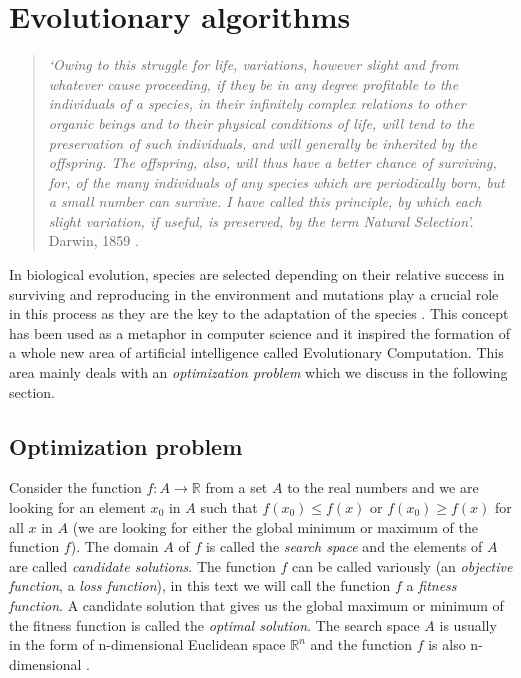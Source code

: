 \chapter{Evolutionary algorithms}
\begin{quotation}
\textit{‘Owing to this struggle for life, variations, however slight and from whatever cause proceeding, if they be in any degree profitable to the individuals of a species, in their infinitely complex relations to other organic beings and to their physical conditions of life, will tend to the preservation of such individuals, and will generally be inherited by the offspring. The offspring, also, will thus have a better chance of surviving, for, of the many individuals of any species which are periodically born, but a small number can survive. I have called this principle, by which each slight variation, if useful, is preserved, by the term Natural Selection’.} Darwin, 1859 \cite[p.40]{Darwin}.
\end{quotation}

In biological evolution, species are selected depending on their relative success in surviving and reproducing in the environment and mutations play a crucial role in this process as they are the key to the adaptation of the species \cite{natural-computing-algorithms}. This concept has been used as a metaphor in computer science and it inspired the formation of a whole new area of artificial intelligence called Evolutionary Computation. This area mainly deals with an \textit{optimization problem} which we discuss in the following section.

\section{Optimization problem}
Consider the function $f: A \to \mathbb{R}$ from a set $A$ to the real numbers and we are looking for an element $x_0$ in $A$ such that $f(x_0) \leq f(x)$ or $f(x_0) \geq f(x)$ for all $x$ in $A$ (we are looking for either the global minimum or maximum of the function $f$). The domain $A$ of $f$ is called the \textit{search space} and the elements of $A$ are called \textit{candidate solutions}. The function $f$ can be called variously (an \textit{objective function}, a \textit{loss function}), in this text we will call the function $f$ a \textit{fitness function}. A candidate solution that gives us the global maximum or minimum of the fitness function is called the \textit{optimal solution}. The search space $A$ is usually in the form of n-dimensional Euclidean space $\mathbb{R}^n$ and the function $f$ is also n-dimensional \cite{evolutionary-algorithms}.

